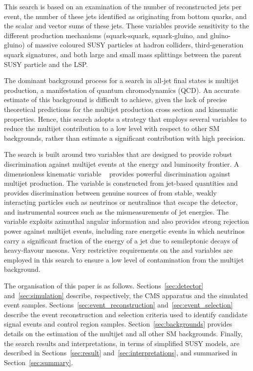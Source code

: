 This search is based on an examination of the number of reconstructed
jets per event, the number of these jets identified as originating
from bottom quarks, and the scalar and vector \Pt sums of these
jets. These variables provide sensitivity to the different production
mechanisms (squark-squark, squark-gluino, and gluino-gluino) of
massive coloured SUSY particles at hadron colliders, third-generation
squark signatures, and both large and small mass splittings between
the parent SUSY particle and the LSP.

The dominant background process for a search in all-jet final states
is multijet production, a manifestation of quantum chromodynamics
(QCD). An accurate estimate of this background is difficult to
achieve, given the lack of precise theoretical predictions for the
multijet production cross section and kinematic properties. 
Hence, this search adopts a strategy that employs several variables to
reduce the multijet contribution to a low level with respect to other
SM backgrounds, rather than estimate a significant contribution with
high precision.

The search is built around two variables that are designed to provide
robust discrimination against multijet events at the energy and
luminosity frontier. A dimensionless kinematic variable
\alphat~\cite{Randall:2008rw, RA1Paper} provides powerful
discrimination against multijet production. The \alphat variable is
constructed from jet-based quantities and provides discrimination
between genuine sources of \ptvecmiss from stable, weakly interacting
particles such as neutrinos or neutralinos that escape the detector,
and instrumental sources such as the mismeasurements of jet energies.
The \bdphi~\cite{RA1Paper} variable exploits azimuthal angular
information and also provides strong rejection power against multijet
events, including rare energetic events in which neutrinos carry a
significant fraction of the energy of a jet due to semileptonic decays
of heavy-flavour mesons. Very restrictive requirements on the \alphat
and \dphi variables are employed in this search to ensure a low level
of contamination from the multijet background.

The organisation of this paper is as
follows. Sections~\ref{sec:detector} and~\ref{sec:simulation}
describe, respectively, the CMS apparatus and the simulated event
samples. Sections~\ref{sec:event_reconstruction}
and~\ref{sec:event_selection} describe the event reconstruction and
selection criteria used to identify candidate signal events and
control region samples. Section~\ref{sec:backgrounds} provides details
on the estimation of the multijet and all other SM
backgrounds. Finally, the search results and interpretations, in terms
of simplified SUSY models, are described in
Sections~\ref{sec:result} and~\ref{sec:interpretations}, and
summarised in Section~\ref{sec:summary}.


